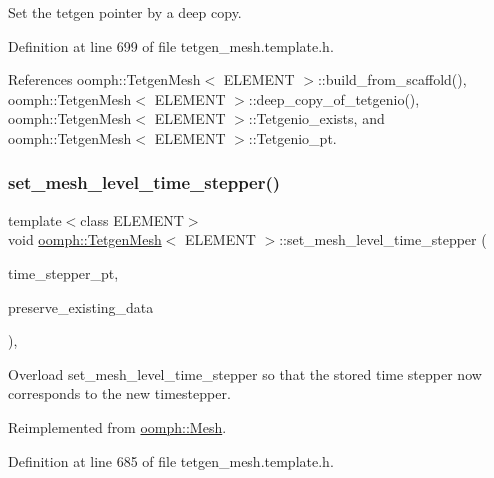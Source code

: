Set the tetgen pointer by a deep copy. 



Definition at line 699 of file tetgen\+\_\+mesh.\+template.\+h.



References oomph\+::\+Tetgen\+Mesh$<$ E\+L\+E\+M\+E\+N\+T $>$\+::build\+\_\+from\+\_\+scaffold(), oomph\+::\+Tetgen\+Mesh$<$ E\+L\+E\+M\+E\+N\+T $>$\+::deep\+\_\+copy\+\_\+of\+\_\+tetgenio(), oomph\+::\+Tetgen\+Mesh$<$ E\+L\+E\+M\+E\+N\+T $>$\+::\+Tetgenio\+\_\+exists, and oomph\+::\+Tetgen\+Mesh$<$ E\+L\+E\+M\+E\+N\+T $>$\+::\+Tetgenio\+\_\+pt.

\mbox{\label{classoomph_1_1TetgenMesh_a9c0441ea7404e7ea404979955ffbb5dd}} 
\subsubsection{\texorpdfstring{set\+\_\+mesh\+\_\+level\+\_\+time\+\_\+stepper()}{set\_mesh\_level\_time\_stepper()}}
{\footnotesize\ttfamily template$<$class E\+L\+E\+M\+E\+NT$>$ \\
void \hyperlink{classoomph_1_1TetgenMesh}{oomph\+::\+Tetgen\+Mesh}$<$ E\+L\+E\+M\+E\+NT $>$\+::set\+\_\+mesh\+\_\+level\+\_\+time\+\_\+stepper (\begin{DoxyParamCaption}\item[{\hyperlink{classoomph_1_1TimeStepper}{Time\+Stepper} $\ast$const \&}]{time\+\_\+stepper\+\_\+pt,  }\item[{const bool \&}]{preserve\+\_\+existing\+\_\+data }\end{DoxyParamCaption})\hspace{0.3cm}{\ttfamily [inline]}, {\ttfamily [virtual]}}



Overload set\+\_\+mesh\+\_\+level\+\_\+time\+\_\+stepper so that the stored time stepper now corresponds to the new timestepper. 



Reimplemented from \hyperlink{classoomph_1_1Mesh_a52c30b4ebc67038e137a5de1c5d422e5}{oomph\+::\+Mesh}.



Definition at line 685 of file tetgen\+\_\+mesh.\+template.\+h.



